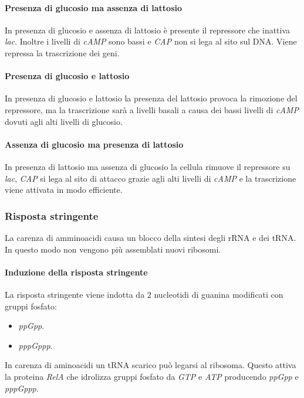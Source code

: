 			\paragraph{Presenza di glucosio ma assenza di lattosio}
			In presenza di glucosio e assenza di lattosio \`e presente il repressore che inattiva \emph{lac}.
			Inoltre i livelli di \emph{cAMP} sono bassi e \emph{CAP} non si lega al sito sul DNA.
			Viene repressa la trascrizione dei geni.

			\paragraph{Presenza di glucosio e lattosio}
			In presenza di glucosio e lattosio la presenza del lattosio provoca la rimozione del repressore, ma la trascrizione sar\`a a livelli basali a causa dei bassi livelli di \emph{cAMP} dovuti agli alti livelli di glucosio.

			\paragraph{Assenza di glucosio ma presenza di lattosio}
			In presenza di lattosio ma assenza di glucosio la cellula rimuove il repressore su \emph{lac}, \emph{CAP} si lega al sito di attacco grazie agli alti livelli di \emph{cAMP} e la trascrizione viene attivata in modo efficiente.

		\subsubsection{Risposta stringente}
		La carenza di amminoacidi causa un blocco della sintesi degli rRNA e dei tRNA.
		In questo modo non vengono pi\`u assemblati nuovi ribosomi.

			\paragraph{Induzione della risposta stringente}
			La risposta stringente viene indotta da $2$ nucleotidi di guanina modificati con gruppi fosfato:
			\begin{multicols}{2}
				\begin{itemize}
					\item \emph{ppGpp}.
					\item \emph{pppGppp}.
				\end{itemize}
			\end{multicols}
			In carenza di aminoacidi un tRNA scarico può legarsi al ribosoma.
			Questo attiva la proteina \emph{RelA} che idrolizza gruppi fosfato da \emph{GTP} e \emph{ATP} producendo \emph{ppGpp} e \emph{pppGppp}.

